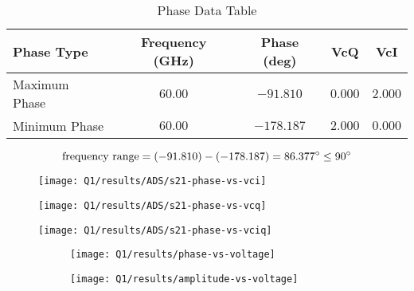 \documentclass[12pt,onecolumn,a4paper]{article}
\begin{document}
	
\begin{table}[h!]
	\centering
	\caption{Phase Data Table}
	\begin{tabular}{|l|c|c|c|c|}
		\hline
		Phase Type & Frequency (GHz) & Phase (deg) & VcQ & VcI \\
		\hline
		Maximum Phase & $60.00$ & $-91.810$ & $0.000$ & $2.000$ \\
		Minimum Phase & $60.00$ & $-178.187$ & $2.000$ & $0.000$ \\
		\hline
	\end{tabular}
\end{table}

\begin{equation}
	\text{frequency range} = (-91.810) - (-178.187) = \fpeval{(-91.810) - (-178.187)}^\circ \le 90^\circ 
\end{equation}


	
	
	\begin{figure}[H]
		\centering
		\texttt{[image: Q1/results/ADS/s21-phase-vs-vci]}
		\caption{}
		\label{fig:s21-phase-vs-vci}
	\end{figure}
	
	
	\begin{figure}[H]
		\centering
		\texttt{[image: Q1/results/ADS/s21-phase-vs-vcq]}
		\caption{}
		\label{fig:s21-phase-vs-vcq}
	\end{figure}
	
	
	\begin{figure}
		\centering
		\texttt{[image: Q1/results/ADS/s21-phase-vs-vciq]}
		\caption{}
		\label{fig:s21-phase-vs-vciq}
	\end{figure}









\begin{figure}[H]
	\begin{subfigure}{.45\linewidth}
		\centering
		\texttt{[image: Q1/results/phase-vs-voltage]}
		\caption{}
		\label{fig:phase-vs-voltage}
	\end{subfigure}
	\hfill
	\begin{subfigure}{.45\linewidth}
		\centering
		\texttt{[image: Q1/results/amplitude-vs-voltage]}
		\caption{}
		\label{fig:amplitude-vs-voltage}
	\end{subfigure}
	\caption{}
\end{figure}
\end{document}
